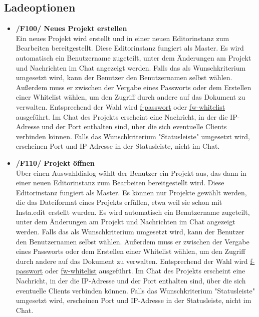 \documentclass{scrartcl}
\makeatletter
\newcommand{\name}{Insta.edit}
\newcommand{\labelFunction}[2]{%
	\Hy@raisedlink{\hypertarget{#1}{}%
    \protected@write\@mainaux{}{%
        \string\expandafter\string\gdef
          \string\csname\string\detokenize{#1}\string\endcsname{#2}%
    }%
  }%
  #2
 }
\newcommand{\refFunction}[1]{%
  \hyperlink{#1}{\csname #1\endcsname}%
  }
\makeatother
\begin{document}
\subsection{Ladeoptionen}
\begin{itemize}	

\item \textbf{\labelFunction{f-neu}{/F100/} Neues Projekt erstellen} \\
Ein neues Projekt wird erstellt und in einer neuen Editorinstanz zum Bearbeiten bereitgestellt. Diese Editorinstanz fungiert als Master. Es wird automatisch ein Benutzername zugeteilt, unter dem Änderungen am Projekt und Nachrichten im Chat angezeigt werden. Falls das als Wunschkriterium umgesetzt wird, kann der Benutzer den Benutzernamen selbst wählen. Außerdem muss er zwischen der Vergabe eines Passworts oder dem Erstellen einer Whitelist wählen, um den Zugriff durch andere auf das Dokument zu verwalten. Entsprechend der Wahl wird \refFunction{f-passwort} oder \refFunction{fw-whitelist} ausgeführt. Im Chat des Projekts erscheint eine Nachricht, in der die IP-Adresse und der Port enthalten sind, über die sich eventuelle Clients verbinden können.  Falls das Wunschkriterium "Statusleiste" umgesetzt wird, erscheinen Port und IP-Adresse in der Statusleiste, nicht im Chat.

\item \textbf{\labelFunction{f-oeffnen}{/F110/} Projekt öffnen} \\
Über einen Auswahldialog wählt der Benutzer ein Projekt aus, das dann in einer neuen Editorinstanz zum Bearbeiten bereitgestellt wird. Diese Editorinstanz fungiert als Master. Es können nur Projekte gewählt werden, die das Dateiformat eines Projekts erfüllen, etwa weil sie schon mit \name\ erstellt wurden.  Es wird automatisch ein Benutzername zugeteilt, unter dem Änderungen am Projekt und Nachrichten im Chat angezeigt werden. Falls das als Wunschkriterium umgesetzt wird, kann der Benutzer den Benutzernamen selbst wählen. Außerdem muss er zwischen der Vergabe eines Passworts oder dem Erstellen einer Whitelist wählen, um den Zugriff durch andere auf das Dokument zu verwalten. Entsprechend der Wahl wird \refFunction{f-passwort} oder \refFunction{fw-whitelist} ausgeführt. Im Chat des Projekts erscheint eine Nachricht, in der die IP-Adresse und der Port enthalten sind, über die sich eventuelle Clients verbinden können.  Falls das Wunschkriterium "Statusleiste" umgesetzt wird, erscheinen Port und IP-Adresse in der Statusleiste, nicht im Chat.
	

\end{itemize}
\end{document}
